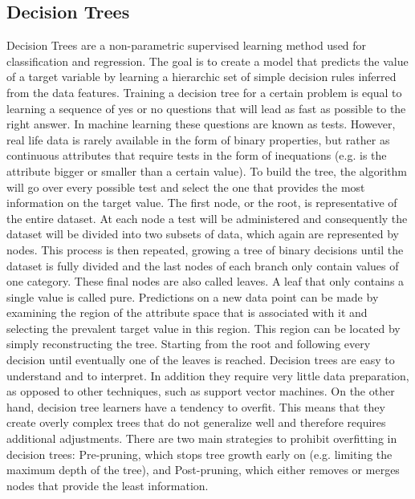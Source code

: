 \subsection{Decision Trees}
Decision Trees are a non-parametric supervised learning method used for classification and regression. The goal is to create a model that predicts the value of a target variable by learning a hierarchic set of simple decision rules inferred from the data features. Training a decision tree for a certain problem is equal to learning a sequence of yes or no questions that will lead as fast as possible to the right answer. In machine learning these questions are known as tests. However, real life data is rarely available in the form of binary properties, but rather as continuous attributes that require tests in the form of inequations (e.g. is the attribute bigger or smaller than a certain value).     To build the tree, the algorithm will go over every possible test and select the one that provides the most information on the target value. The first node, or the root, is representative of the entire dataset. At each node a test will be administered and consequently the dataset will be divided into two subsets of data, which again are represented by nodes. This process is then repeated, growing a tree of binary decisions until the dataset is fully divided and the last nodes of each branch only contain values of one category. These final nodes are also called leaves. A leaf that only contains a single value is called pure. Predictions on a new data point can be made by examining the region of the attribute space that is associated with it and selecting the prevalent target value in this region. This region can be located by simply reconstructing the tree. Starting from the root and following every decision until eventually one of the leaves is reached.
Decision trees are easy to understand and to interpret. In addition they require  very little data preparation, as opposed to other techniques, such as support vector machines. On the other hand, decision tree learners have a tendency to overfit. This means that they create overly complex trees that do not generalize well and therefore requires additional adjustments. There are two main strategies to prohibit overfitting in decision trees: Pre-pruning, which stops tree growth early on (e.g. limiting the maximum depth of the tree), and Post-pruning, which either removes or merges nodes that provide the least information.

